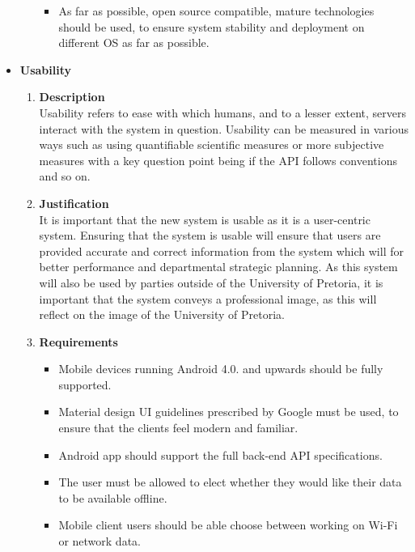 \documentclass[a4paper,10pt]{article}
\begin{document}
\begin{itemize}
\begin{enumerate}
\begin{itemize}
		\item As far as possible, open source compatible, mature technologies should be used, to ensure system stability and deployment on different OS as far as possible.
	\end{itemize}
\end{enumerate}
\item \textbf {Usability}
\begin{enumerate}
\item \textbf{Description} \\
Usability refers to ease with which humans, and to a lesser extent, servers interact with the system in question. Usability can be measured in various ways such as using quantifiable scientific measures or more subjective measures with a key question point being if the API follows conventions and so on.
\item \textbf{Justification} \\
It is important that the new system is usable as it is a user-centric system. Ensuring that the system is usable will ensure that users are provided accurate and correct information from the system which will for better performance and departmental strategic planning. As this system will also be used by parties outside of the University of Pretoria, it is important that the system conveys a professional image, as this will reflect on the image of the University of Pretoria. 
\item \textbf{Requirements}
	\begin{itemize}
		\item Mobile devices running Android 4.0. and upwards should be fully supported.
		\item Material design UI guidelines prescribed by Google must be used, to ensure that the clients feel modern and familiar. 
		\item Android app should support the full back-end API specifications.
		\item The user must be allowed to elect whether they would like their data to be available offline.
		\item Mobile client users should be able choose between working on Wi-Fi  or network data. 
	\end{itemize}
\end{enumerate}
\end{itemize}
\end{document}
